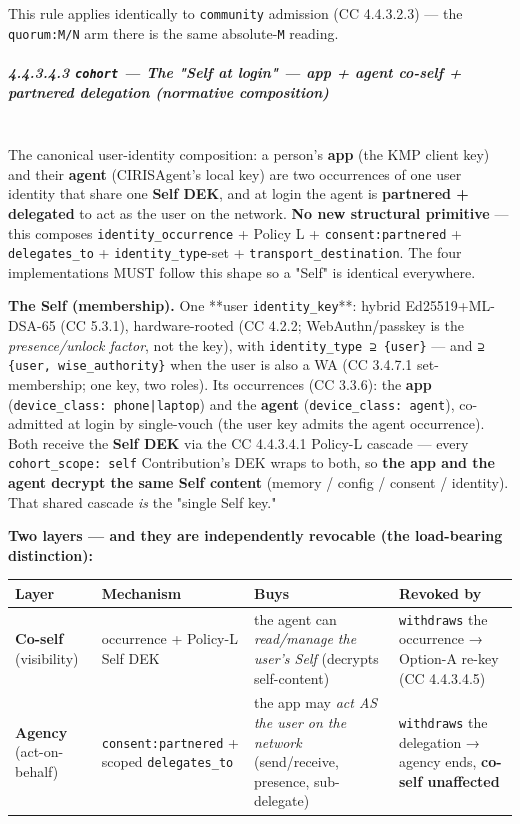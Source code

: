 \documentclass[11pt]{article}
\begin{document}
This rule applies identically to \texttt{community} admission (CC 4.4.3.2.3) — the \texttt{quorum:M/N} arm there is the same absolute-\texttt{M} reading.


\subparagraph{4.4.3.4.3 \texttt{cohort} — The "Self at login" — app + agent co-self + partnered delegation (normative composition)}\mbox{}\\


The canonical user-identity composition: a person's \textbf{app} (the KMP client key) and their \textbf{agent} (CIRISAgent's local key) are two occurrences of one user identity that share one \textbf{Self DEK}, and at login the agent is \textbf{partnered + delegated} to act as the user on the network. \textbf{No new structural primitive} — this composes \texttt{identity\_occurrence} + Policy L + \texttt{consent:partnered} + \texttt{delegates\_to} + \texttt{identity\_type}-set + \texttt{transport\_destination}. The four implementations MUST follow this shape so a "Self" is identical everywhere.


\textbf{The Self (membership).} One **user \texttt{identity\_key}**: hybrid Ed25519+ML-DSA-65 (CC 5.3.1), hardware-rooted (CC 4.2.2; WebAuthn/passkey is the \textit{presence/unlock factor}, not the key), with \texttt{identity\_type ⊇ \{user\}} — and \texttt{⊇ \{user, wise\_authority\}} when the user is also a WA (CC 3.4.7.1 set-membership; one key, two roles). Its occurrences (CC 3.3.6): the \textbf{app} (\texttt{device\_class: phone|laptop}) and the \textbf{agent} (\texttt{device\_class: agent}), co-admitted at login by single-vouch (the user key admits the agent occurrence). Both receive the \textbf{Self DEK} via the CC 4.4.3.4.1 Policy-L cascade — every \texttt{cohort\_scope: self} Contribution's DEK wraps to both, so \textbf{the app and the agent decrypt the same Self content} (memory / config / consent / identity). That shared cascade \textit{is} the "single Self key."


\textbf{Two layers — and they are independently revocable (the load-bearing distinction):}


{\scriptsize
\begin{longtable}{|p{4.0cm}|p{4.0cm}|p{4.0cm}|p{4.0cm}|}\hline
\textbf{Layer} & \textbf{Mechanism} & \textbf{Buys} & \textbf{Revoked by} \\ \hline\endhead
\textbf{Co-self} (visibility) & occurrence + Policy-L Self DEK & the agent can \textit{read/manage the user's Self} (decrypts self-content) & \texttt{withdraws} the occurrence → Option-A re-key (CC 4.4.3.4.5) \\ \hline
\textbf{Agency} (act-on-behalf) & \texttt{consent:partnered} + scoped \texttt{delegates\_to} & the app may \textit{act AS the user on the network} (send/receive, presence, sub-delegate) & \texttt{withdraws} the delegation → agency ends, \textbf{co-self unaffected} \\ \hline
\end{longtable}}
\end{document}
